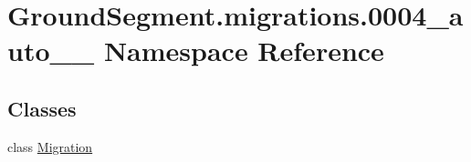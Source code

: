 \hypertarget{namespace_ground_segment_1_1migrations_1_10004__auto__20161126__1516}{}\section{Ground\+Segment.\+migrations.0004\+\_\+auto\+\_\+\_ Namespace Reference}
\label{namespace_ground_segment_1_1migrations_1_10004__auto__20161126__1516}
\subsection*{Classes}
\begin{DoxyCompactItemize}
\item 
class \hyperlink{class_ground_segment_1_1migrations_1_10004__auto__20161126__1516_1_1_migration}{Migration}
\end{DoxyCompactItemize}
